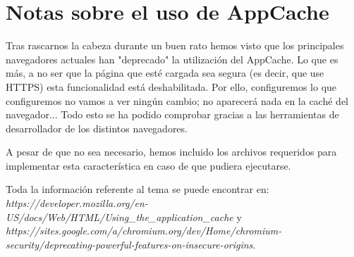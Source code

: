 \documentclass{article}[13pt]
\begin{document}
  \section{Notas sobre el uso de AppCache}
    Tras rascarnos la cabeza durante un buen rato hemos visto que los principales navegadores actuales han "deprecado" la utilización del AppCache. Lo que es más, a no ser que la página que esté cargada sea segura (es decir, que use HTTPS) esta funcionalidad está deshabilitada. Por ello, configuremos lo que configuremos no vamos a ver ningún cambio; no aparecerá nada en la caché del navegador... Todo esto se ha podido comprobar gracias a las herramientas de desarrollador de los distintos navegadores.

    A pesar de que no sea necesario, hemos incluido los archivos requeridos para implementar esta característica en caso de que pudiera ejecutarse.

    Toda la información referente al tema se puede encontrar en: \textit{https://developer.mozilla.org/en-US/docs/Web/HTML/Using_the_application_cache} y \textit{https://sites.google.com/a/chromium.org/dev/Home/chromium-security/deprecating-powerful-features-on-insecure-origins}.
\end{document}
